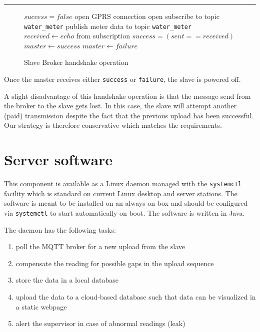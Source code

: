 \par\noindent\rule{\textwidth}{0.4pt}

\begin{figure}[h]
    \centering
    \begin{algorithmic}
        \State $success = false$
        \State open GPRS connection
        \State open subscribe to topic \texttt{water\_meter}
        \State publish meter data to topic \texttt{water\_meter}
        \State $received \gets echo$ from subscription
        \State $success = (sent == received)$
        \EndFor
        \State $master \gets success$
        \Else
        \State $master \gets failure$
        \EndIf
    \end{algorithmic}

    \caption{Slave Broker handshake operation}
\end{figure}

Once the master receives either \texttt{success} or \texttt{failure}, the slave is powered off.

A slight disadvantage of this handshake operation is that the message send from the broker to the slave
gets lost. In this case, the slave will attempt another (paid) transmission despite the fact that the previous upload
has been successful. Our strategy is therefore conservative which matches the requirements.


\section{Server software}

This component is available as a Linux daemon managed with the \texttt{systemctl} facility which is standard on
current Linux desktop and server stations. The software is meant to be installed on an always-on box and should be
configured via \texttt{systemctl} to start automatically on boot. The software is written in Java.

The daemon has the following tasks:

\begin{enumerate}
    \item poll the MQTT broker for a new upload from the slave
    \item compensate the reading for possible gaps in the upload sequence
    \item store the data in a local database
    \item upload the data to a cloud-based database such that data can be visualized in a static webpage
    \item alert the supervisor in case of abnormal readings (leak)
\end{enumerate}


